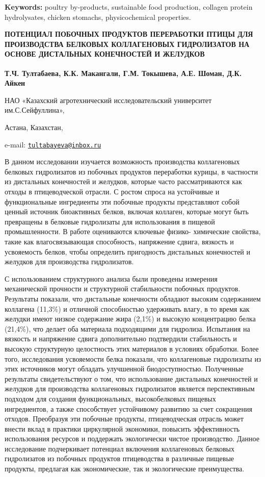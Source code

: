 {\bfseries Keywords:} poultry by-products, sustainable food production,
collagen protein hydrolysates, chicken stomachs, physicochemical
properties.


\begin{articleheader}
{\bfseries ПОТЕНЦИАЛ ПОБОЧНЫХ ПРОДУКТОВ ПЕРЕРАБОТКИ ПТИЦЫ ДЛЯ ПРОИЗВОДСТВА БЕЛКОВЫХ КОЛЛАГЕНОВЫХ ГИДРОЛИЗАТОВ НА ОСНОВЕ
ДИСТАЛЬНЫХ КОНЕЧНОСТЕЙ И ЖЕЛУДКОВ}

{\bfseries Т.Ч. Тултабаева\textsuperscript{\envelope }, К.К. Макангали, Г.М. Токышева, А.Е.
Шоман, Д.К. Айкен} 
\end{articleheader}

\begin{affiliation}
НАО «Казахский агротехнический исследовательский университет
им.С.Сейфуллина»,

Астана, Казахстан,

e-mail: \href{mailto:tultabayeva@inbox.ru}{\nolinkurl{tultabayeva@inbox.ru}}
\end{affiliation}

В данном исследовании изучается возможность производства коллагеновых
белковых гидролизатов из побочных продуктов переработки курицы, в
частности из дистальных конечностей и желудков, которые часто
рассматриваются как отходы в птицеводческой отрасли. С ростом спроса на
устойчивые и функциональные ингредиенты эти побочные продукты
представляют собой ценный источник биоактивных белков, включая коллаген,
которые могут быть превращены в белковые гидролизаты для использования в
пищевой промышленности. В работе оцениваются ключевые физико- химические
свойства, такие как влагосвязывающая способность, напряжение сдвига,
вязкость и усвояемость белков, чтобы определить пригодность дистальных
конечностей и желудков для производства гидролизатов.

С использованием структурного анализа были проведены измерения
механической прочности и структурной стабильности побочных продуктов.
Результаты показали, что дистальные конечности обладают высоким
содержанием коллагена (11,3\%) и отличной способностью удерживать влагу,
в то время как желудки имеют низкое содержание жира (2,1\%) и высокую
концентрацию белка (21,4\%), что делает оба материала подходящими для
гидролиза. Испытания на вязкость и напряжение сдвига дополнительно
подтвердили стабильность и высокую структурную целостность этих
материалов в условиях обработки. Более того, исследования усвояемости
белка показали, что коллагеновые гидролизаты из этих источников могут
обладать улучшенной биодоступностью. Полученные результаты
свидетельствуют о том, что использование дистальных конечностей и
желудков для производства коллагеновых гидролизатов является
перспективным подходом для создания функциональных, высокобелковых
пищевых ингредиентов, а также способствует устойчивому развитию за счет
сокращения отходов. Преобразуя эти побочные продукты, птицеводческая
отрасль может внести вклад в практики циркулярной экономики, повысить
эффективность использования ресурсов и поддержать экологически чистое
производство. Данное исследование подчеркивает потенциал включения
коллагеновых белковых гидролизатов из побочных продуктов птицеводства в
различные пищевые продукты, предлагая как экономические, так и
экологические преимущества.

